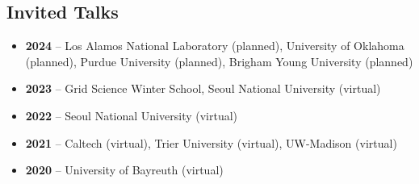 \documentclass[letterpaper, 11pt]{article}
\begin{document}
\subsection*{Invited Talks}
\begin{itemize}[itemsep=1pt, parsep=0pt,leftmargin=*]
\item[] {\bf 2024} -- Los Alamos National Laboratory (planned), University of Oklahoma (planned), Purdue University (planned), Brigham Young University (planned)
\item[] {\bf 2023} -- Grid Science Winter School, Seoul National University (virtual)
\item[] {\bf 2022} -- Seoul National University (virtual)
\item[] {\bf 2021} -- Caltech (virtual), Trier University (virtual), UW-Madison (virtual)
\item[] {\bf 2020} -- University of Bayreuth (virtual)
\end{itemize}
\end{document}
